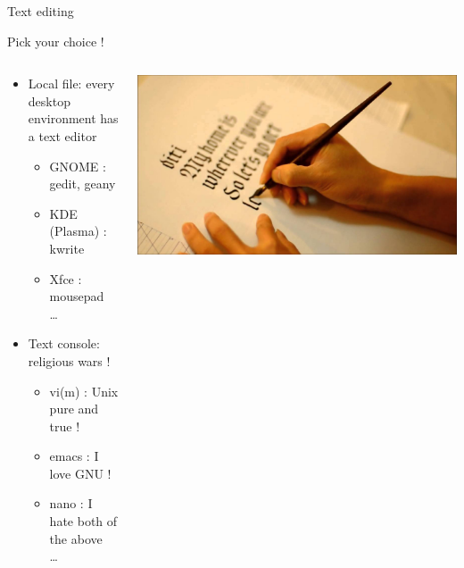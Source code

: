 \documentclass[unknownkeysallowed, 10pt, a4 paper, handout]{beamer}
\begin{document}
\begin{frame}[label=textedit]{Text editing}
  \begin{center}
  Pick your choice !
  \end{center}
  \begin{columns}[T]
    \begin{column}{.55\textwidth}
      \begin{itemize}
        \item Local file: every desktop environment has a text editor
        \begin{itemize}
          \item GNOME : gedit, geany
          \item KDE (Plasma) : kwrite
          \item Xfce : mousepad \\
            \dots
        \end{itemize}
        \item Text console: religious wars !
        \begin{itemize}
          \item vi(m) : Unix pure and true !
          \item emacs : I love GNU !
          \item nano  : I hate both of the above \\
            \dots
        \end{itemize}
      \end{itemize}
    \end{column}
    \hfill
    \begin{column}{.45\textwidth}
      \vspace{10pt}
       \includegraphics[scale=0.1]{pics/manuscript.jpg}
    \end{column}
  \end{columns}
\end{frame}
\end{document}
